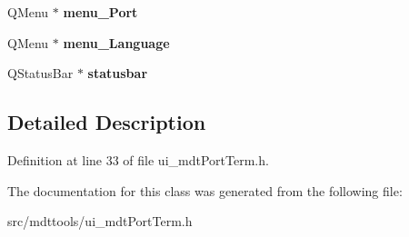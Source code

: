 \begin{DoxyCompactItemize}
\item 
\hypertarget{class_ui__mdt_port_term_a432f9e70278ef43133af282fba27092f}{
QMenu $\ast$ {\bfseries menu\_\-Port}}
\label{class_ui__mdt_port_term_a432f9e70278ef43133af282fba27092f}

\item 
\hypertarget{class_ui__mdt_port_term_a76b28956d67d1b795842eac918dadb49}{
QMenu $\ast$ {\bfseries menu\_\-Language}}
\label{class_ui__mdt_port_term_a76b28956d67d1b795842eac918dadb49}

\item 
\hypertarget{class_ui__mdt_port_term_ae922f4e6f3b8aa1db954038b8e335254}{
QStatusBar $\ast$ {\bfseries statusbar}}
\label{class_ui__mdt_port_term_ae922f4e6f3b8aa1db954038b8e335254}

\end{DoxyCompactItemize}


\subsection{Detailed Description}


Definition at line 33 of file ui\_\-mdtPortTerm.h.



The documentation for this class was generated from the following file:\begin{DoxyCompactItemize}
\item 
src/mdttools/ui\_\-mdtPortTerm.h\end{DoxyCompactItemize}
